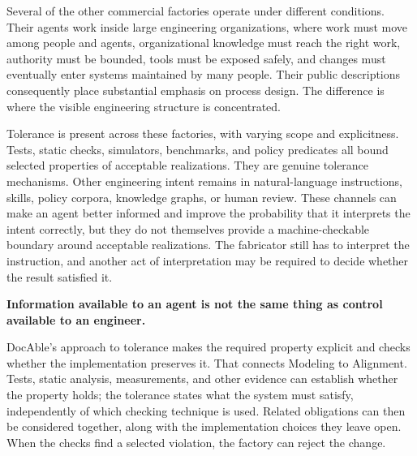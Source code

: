 Several of the other commercial factories operate under different conditions. Their agents work inside large engineering organizations, where work must move among people and agents, organizational knowledge must reach the right work, authority must be bounded, tools must be exposed safely, and changes must eventually enter systems maintained by many people. Their public descriptions consequently place substantial emphasis on process design. The difference is where the visible engineering structure is concentrated.


Tolerance is present across these factories, with varying scope and explicitness. Tests, static checks, simulators, benchmarks, and policy predicates all bound selected properties of acceptable realizations. They are genuine tolerance mechanisms. Other engineering intent remains in natural-language instructions, skills, policy corpora, knowledge graphs, or human review. These channels can make an agent better informed and improve the probability that it interprets the intent correctly, but they do not themselves provide a machine-checkable boundary around acceptable realizations. The fabricator still has to interpret the instruction, and another act of interpretation may be required to decide whether the result satisfied it.

\textbf{Information available to an agent is not the same thing as control available to an engineer.}


DocAble's approach to tolerance makes the required property explicit and checks whether the implementation preserves it. That connects Modeling to Alignment. Tests, static analysis, measurements, and other evidence can establish whether the property holds; the tolerance states what the system must satisfy, independently of which checking technique is used. Related obligations can then be considered together, along with the implementation choices they leave open. When the checks find a selected violation, the factory can reject the change.

